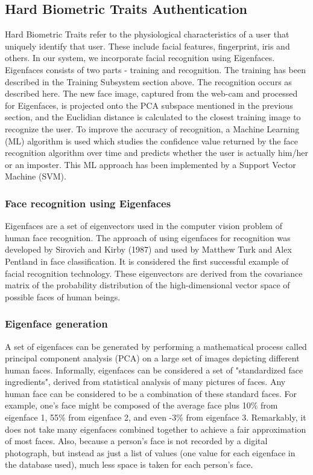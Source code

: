\documentclass[12pt]{article}			%
\begin{document}
\subsection{Hard Biometric Traits Authentication}
Hard Biometric Traits refer to the physiological characteristics of a user that uniquely identify that user. These include facial features, fingerprint, iris and others. In our system, we incorporate facial recognition using Eigenfaces. Eigenfaces consists of two parts - training and recognition. The training has been described in the Training Subsystem section above. The recognition occurs as described here. The new face image, captured from the web-cam and processed for Eigenfaces, is projected onto the PCA subspace mentioned in the previous section, and the Euclidian distance is calculated to the closest training image to recognize the user. To improve the accuracy of recognition, a Machine Learning (ML) algorithm is used which studies the confidence value returned by the face recognition algorithm over time and predicts whether the user is actually him/her or an imposter. This ML approach has been implemented by a Support Vector Machine (SVM).

\subsubsection{Face recognition using Eigenfaces}
Eigenfaces are a set of eigenvectors used in the computer vision problem of human face recognition. The approach of using eigenfaces for recognition was developed by Sirovich and Kirby (1987) and used by Matthew Turk and Alex Pentland in face classification. It is considered the first successful example of facial recognition technology. These eigenvectors are derived from the covariance matrix of the probability distribution of the high-dimensional vector space of possible faces of human beings.\\

\subsubsection{ Eigenface generation }
A set of eigenfaces can be generated by performing a mathematical process called principal component analysis (PCA) on a large set of images depicting different human faces. Informally, eigenfaces can be considered a set of "standardized face ingredients", derived from statistical analysis of many pictures of faces. Any human face can be considered to be a combination of these standard faces. For example, one's face might be composed of the average face plus 10\% from eigenface 1, 55\% from eigenface 2, and even -3\% from eigenface 3. Remarkably, it does not take many eigenfaces combined together to achieve a fair approximation of most faces. Also, because a person's face is not recorded by a digital photograph, but instead as just a list of values (one value for each eigenface in the database used), much less space is taken for each person's face.
\end{document}
